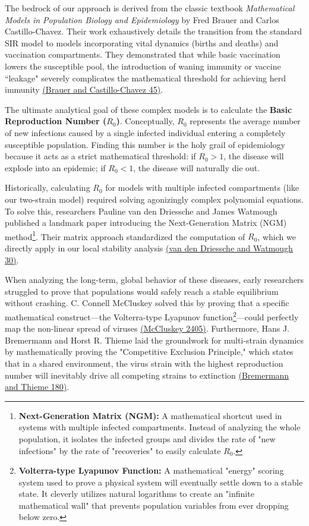 \documentclass[12pt]{article}
\begin{document}
The bedrock of our approach is derived from the classic textbook \textit{Mathematical Models in Population Biology and Epidemiology} by Fred Brauer and Carlos Castillo-Chavez. Their work exhaustively details the transition from the standard SIR model to models incorporating vital dynamics (births and deaths) and vaccination compartments. They demonstrated that while basic vaccination lowers the susceptible pool, the introduction of waning immunity or vaccine ``leakage" severely complicates the mathematical threshold for achieving herd immunity \hyperref[brauer2012]{(Brauer and Castillo-Chavez 45)}. 

The ultimate analytical goal of these complex models is to calculate the \textbf{Basic Reproduction Number ($R_0$)}. Conceptually, $R_0$ represents the average number of new infections caused by a single infected individual entering a completely susceptible population. Finding this number is the holy grail of epidemiology because it acts as a strict mathematical threshold: if $R_0 > 1$, the disease will explode into an epidemic; if $R_0 < 1$, the disease will naturally die out. 

Historically, calculating $R_0$ for models with multiple infected compartments (like our two-strain model) required solving agonizingly complex polynomial equations. To solve this, researchers Pauline van den Driessche and James Watmough published a landmark paper introducing the Next-Generation Matrix (NGM) method\footnote{\textbf{Next-Generation Matrix (NGM):} A mathematical shortcut used in systems with multiple infected compartments. Instead of analyzing the whole population, it isolates the infected groups and divides the rate of "new infections" by the rate of "recoveries" to easily calculate $R_0$.}. Their matrix approach standardized the computation of $R_0$, which we directly apply in our local stability analysis \hyperref[vandendriessche2002]{(van den Driessche and Watmough 30)}.

When analyzing the long-term, global behavior of these diseases, early researchers struggled to prove that populations would safely reach a stable equilibrium without crashing. C. Connell McCluskey solved this by proving that a specific mathematical construct—the Volterra-type Lyapunov function\footnote{\textbf{Volterra-type Lyapunov Function:} A mathematical "energy" scoring system used to prove a physical system will eventually settle down to a stable state. It cleverly utilizes natural logarithms to create an "infinite mathematical wall" that prevents population variables from ever dropping below zero.}—could perfectly map the non-linear spread of viruses \hyperref[mccluskey2010]{(McCluskey 2405)}. Furthermore, Hans J. Bremermann and Horst R. Thieme laid the groundwork for multi-strain dynamics by mathematically proving the "Competitive Exclusion Principle," which states that in a shared environment, the virus strain with the highest reproduction number will inevitably drive all competing strains to extinction \hyperref[bremermann1989]{(Bremermann and Thieme 180)}.
\end{document}
